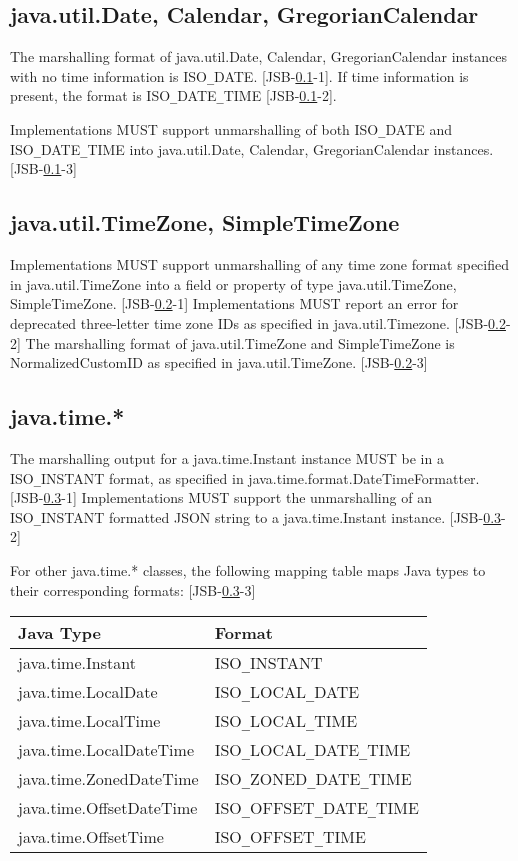 \subsection{java.util.Date, Calendar, GregorianCalendar}
\label{subsec:datecalendar}
The marshalling format of java.util.Date, Calendar, GregorianCalendar instances with no time information is ISO\verb|_|DATE. [JSB-\ref{subsec:datecalendar}-1]. If time information is present, the format is ISO\verb|_|DATE\verb|_|TIME [JSB-\ref{subsec:datecalendar}-2].

Implementations MUST support unmarshalling of both ISO\verb|_|DATE and ISO\verb|_|DATE\verb|_|TIME into java.util.Date, Calendar, GregorianCalendar instances. [JSB-\ref{subsec:datecalendar}-3]

\subsection{java.util.TimeZone, SimpleTimeZone}
\label{subsec:dateTimezone}

Implementations MUST support unmarshalling of any time zone format specified in java.util.TimeZone into a field or property of type java.util.TimeZone, SimpleTimeZone. [JSB-\ref{subsec:dateTimezone}-1] 
Implementations MUST report an error for deprecated three-letter time zone IDs as specified in java.util.Timezone. [JSB-\ref{subsec:dateTimezone}-2]
The marshalling format of java.util.TimeZone and SimpleTimeZone is NormalizedCustomID as specified in java.util.TimeZone. [JSB-\ref{subsec:dateTimezone}-3]

\subsection{java.time.*}
\label{subsec:time}

The marshalling output for a java.time.Instant instance MUST be in a ISO\verb|_|INSTANT format, as specified in 
java.time.format.DateTimeFormatter. [JSB-\ref{subsec:time}-1]
Implementations MUST support the unmarshalling of an ISO\verb|_|INSTANT formatted JSON string to a java.time.Instant instance. [JSB-\ref{subsec:time}-2]

For other java.time.* classes, the following mapping table maps Java types to their corresponding formats: [JSB-\ref{subsec:time}-3]

\begin{tabularx}{\textwidth}{ |X|X| }
\hline
Java Type & Format \\ 
\hline
java.time.Instant & ISO\verb|_|INSTANT\\
java.time.LocalDate & ISO\verb|_|LOCAL\verb|_|DATE\\
java.time.LocalTime & ISO\verb|_|LOCAL\verb|_|TIME\\
java.time.LocalDateTime & ISO\verb|_|LOCAL\verb|_|DATE\verb|_|TIME\\
java.time.ZonedDateTime & ISO\verb|_|ZONED\verb|_|DATE\verb|_|TIME\\
java.time.OffsetDateTime & ISO\verb|_|OFFSET\verb|_|DATE\verb|_|TIME\\
java.time.OffsetTime & ISO\verb|_|OFFSET\verb|_|TIME\\
\hline
\end{tabularx}

